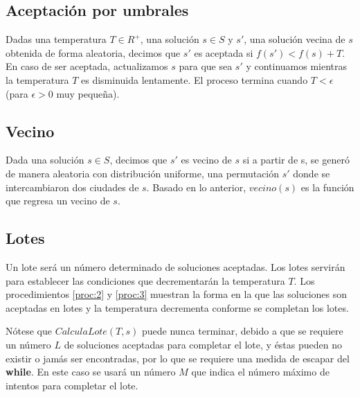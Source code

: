 \documentclass[12pt, letterpaper]{article}
\begin{document}
\subsection{Aceptación por umbrales}

Dadas una temperatura $T \in R^+$, una solución $s \in S$ y $s'$, una solución vecina de $s$ obtenida de forma aleatoria, decimos que $s'$ es aceptada si $f(s') < f(s) + T$. En caso de ser aceptada, actualizamos $s$ para que sea $s'$ y continuamos mientras la temperatura $T$ es disminuida lentamente. El proceso termina cuando $T < \epsilon$ (para $\epsilon > 0$ muy pequeña).

\subsection{Vecino}
\label{sub:1}

Dada una solución $s \in S$, decimos que $s'$ es vecino de $s$ si a partir de s, se generó de manera aleatoria con distribución uniforme, una permutación $s'$ donde se intercambiaron dos ciudades de $s$. Basado en lo anterior, $vecino(s)$ es la función que regresa un vecino de $s$.

\subsection{Lotes}

Un lote será un número determinado de soluciones aceptadas. Los lotes servirán para establecer las condiciones que decrementarán la temperatura $T$. Los procedimientos \ref{proc:2} y \ref{proc:3} muestran la forma en la que las soluciones son aceptadas en lotes y la temperatura decrementa conforme se completan los lotes.
\par
Nótese que $CalculaLote(T,s)$ puede nunca terminar, debido a que se requiere un número $L$ de soluciones aceptadas para completar el lote, y éstas pueden no existir o jamás ser encontradas, por lo que se requiere una medida de escapar del \textbf{while}. En este caso se usará un número $M$ que indica el número máximo de intentos para completar el lote.
\end{document}
